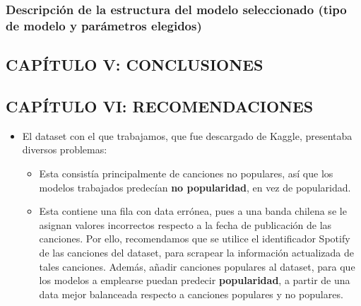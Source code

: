 \documentclass[
  letterpaper,
  DIV=11,
  numbers=noendperiod]{scrartcl}
\providecommand{\tightlist}{%
  \setlength{\itemsep}{0pt}\setlength{\parskip}{0pt}}
\begin{document}
\hypertarget{descripciuxf3n-de-la-estructura-del-modelo-seleccionado-tipo-de-modelo-y-paruxe1metros-elegidos}{%
\subsubsection{Descripción de la estructura del modelo seleccionado
(tipo de modelo y parámetros
elegidos)}\label{descripciuxf3n-de-la-estructura-del-modelo-seleccionado-tipo-de-modelo-y-paruxe1metros-elegidos}}

\hypertarget{capuxedtulo-v-conclusiones}{%
\subsection{CAPÍTULO V: CONCLUSIONES}\label{capuxedtulo-v-conclusiones}}

\hypertarget{capuxedtulo-vi-recomendaciones}{%
\subsection{CAPÍTULO VI:
RECOMENDACIONES}\label{capuxedtulo-vi-recomendaciones}}

\begin{itemize}
\tightlist
\item
  El dataset con el que trabajamos, que fue descargado de Kaggle,
  presentaba diversos problemas:

  \begin{itemize}
  \tightlist
  \item
    Esta consistía principalmente de canciones no populares, así que los
    modelos trabajados predecían \textbf{no popularidad}, en vez de
    popularidad.
  \item
    Esta contiene una fila con data errónea, pues a una banda chilena se
    le asignan valores incorrectos respecto a la fecha de publicación de
    las canciones. Por ello, recomendamos que se utilice el
    identificador Spotify de las canciones del dataset, para scrapear la
    información actualizada de tales canciones. Además, añadir canciones
    populares al dataset, para que los modelos a emplearse puedan
    predecir \textbf{popularidad}, a partir de una data mejor balanceada
    respecto a canciones populares y no populares.
  \end{itemize}
\end{itemize}
\end{document}
